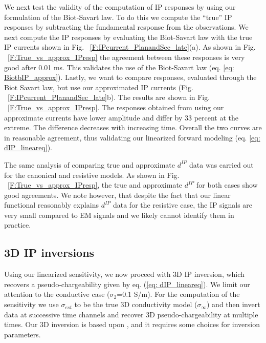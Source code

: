 \documentclass[extra,mreferee]{gji}
\newcommand{\siginf}{\sigma_\infty}
\newcommand{\dip}{d^{IP}}
\begin{document}
We next test the validity of the computation of IP responses by using our formulation of the Biot-Savart law. To do this we compute the ``true'' IP responses  by subtracting the fundamental response from the observations. We next compute the IP responses by evaluating the Biot-Savart law with the true IP currents shown in Fig. ~\ref{F:IPcurrent_PlanandSec_late}(a). As shown in Fig. ~\ref{F:True_vs_approx_IPresp} the agreement between these responses is very good after 0.01 ms. This validates the use of the Biot-Savart law (eq. \ref{eq: BiotbIP_approx}). Lastly, we want to compare responses, evaluated through the Biot Savart law, but use our approximated IP currents (Fig. ~\ref{F:IPcurrent_PlanandSec_late}b). The results are shown in Fig. ~\ref{F:True_vs_approx_IPresp}. The responses obtained from using our approximate currents have lower amplitude and differ by 33 percent at the extreme. The difference decreases with increasing time. Overall the two curves are in reasonable agreement, thus validating our linearized forward modeling (eq. \ref{eq: dIP_lineareq}).

The same analysis of comparing true and approximate $\dip$ data was carried out for the canonical and resistive models.
As shown in  Fig. ~\ref{F:True_vs_approx_IPresp}, the true and approximate $\dip$ for both cases show good agreements.
We note however, that despite the fact that our linear functional reasonably explains $\dip$ data for the resistive case, the IP signals are very small compared to EM signals and we likely cannot identify them in practice.


\subsection{3D IP inversions}
Using our linearized sensitivity, we now proceed with 3D IP inversion, which recovers a pseudo-chargeability given by eq. (\ref{eq: dIP_lineareq}).
We limit our attention to the conductive case ($\sigma_2$=0.1 S/m). For the computation of the sensitivity we use $\sigma_{est}$ to be the true 3D conductivity model ($\siginf$) and then invert data at successive time channels and recover 3D pseudo-chargeability at multiple times.
Our 3D inversion is based upon \cite[]{doug1994,Li2000}, and it requires some choices for inversion parameters.
\end{document}
